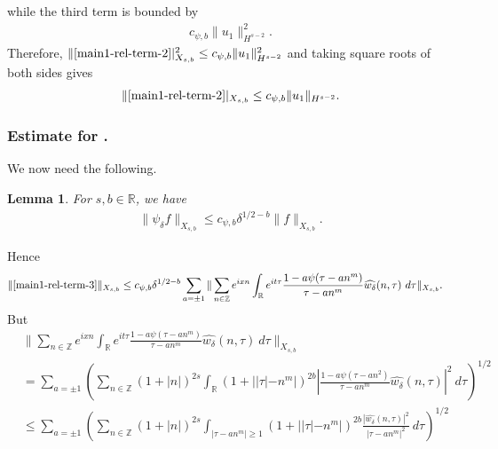 \documentclass[12pt,reqno]{amsart}
\numberwithin{equation}{section}  %
\renewcommand{\cref}{\Cref}
\newcommand{\rr}{\mathbb{R}}
\newcommand{\zz}{\mathbb{Z}}
\newcommand{\wh}{\widehat}
\newtheorem{lemma}[theorem]{Lemma}
\begin{document}
while the third term is bounded by  
%
%
\begin{equation*}
\begin{split}
  c_{\psi,b}  \| u_{1} \|_{H^{s-2}}^{2}.
\end{split}
\end{equation*}
%
%
Therefore, 
$\|\cref{main1-rel-term-2}|_{X_{s,b}}^{2} \le c_{\psi,b} 
\|u_{1}\|_{H^{s-2}}^2$ and
taking square roots of both sides gives
%
%
\begin{equation}
  \label{u-1-est}
  \begin{split}
    \|\cref{main1-rel-term-2}|_{X_{s,b}} \le c_{\psi,b} 
    \|u_{1}\|_{H^{s-2}}.
  \end{split}
\end{equation}
%
%
%
%
\subsubsection{Estimate for \cref{main1-rel-term-3}.}
%
%
%
%
%
%
%
%
%
We now need the following.
%
\begin{lemma}
\label{lem:schwartz-mult}
For $s, b \in \rr$, we have
%
%
\begin{equation}
	\label{schwartz-mult}
	\begin{split}
    \|\psi_{\delta} f \|_{X_{s,b}} \le c_{\psi, b} \delta^{1/2-b} \|f \|_{X_{s,b}}.
	\end{split}
\end{equation}
%
%
\end{lemma}
%
Hence
%
%
\begin{equation}
  \label{yu}
	\begin{split}
		\|\cref{main1-rel-term-3}\|_{X_{s,b}} 
    & \le c_{\psi, b} \delta^{1/2 - b}
    \sum_{a = \pm 1} \| \sum_{n \in \zz}  e^{ixn} \int_\rr 
		e^{it \tau} \frac{1 - a\psi (\tau - an^{m} ) 
}{\tau - an^{m}} \wh{w_{\delta}}(n, \tau) \ 
		d \tau\|_{X_{s,b}}.
			\end{split}
\end{equation}
%
But
%
%
\begin{equation}
\label{main-int2-est-X-s-part}
\begin{split}
  & \| \sum_{n \in \zz} e^{ixn} \int_\rr 
		e^{it \tau} \frac{1 - a\psi (\tau - an^{m} ) 
  }{\tau - an^{m}} \wh{w_{\delta}}(n, \tau) \ 
		d \tau\|_{X_{s,b}}
		\\
    & = \sum_{a = \pm 1}\left( \sum_{n \in \zz} \left (1 + |n| \right )^{2s} \int_\rr
    (1 + |  |\tau| - n^{m}|)^{2b} \left | \frac{1 - a\psi(\tau - an^{2 
})}{\tau - an^{m}} 
     \wh{w_{\delta}}(n, \tau) \right |^2 \ d 
		\tau \right)^{1/2}
		\\
    & \le \sum_{a = \pm 1}
    \left( \sum_{n \in \zz} \left (1 + |n| \right )^{2s} \int_{| \tau - an^{m}| \ge 1}
    (1 + | |\tau| - n^{m}|)^{2b} \frac{|  \wh{w_{\delta}}(n, \tau)|^2}{|\tau - an^{m}|^2} 
		\ d 
		\tau \right)^{1/2}
  \end{split}
\end{equation}
\end{document}
